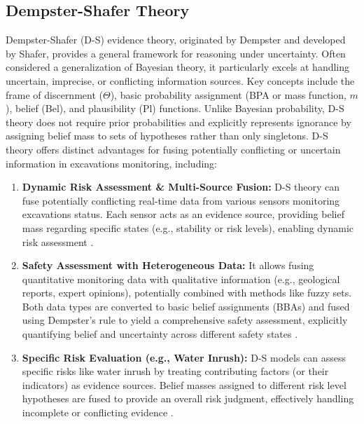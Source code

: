 \documentclass[preprint,11pt,authoryear,3p]{elsarticle}
\begin{document}
\subsection{Dempster-Shafer Theory}

Dempster-Shafer (D-S) evidence theory, originated by Dempster and developed by Shafer, provides a general framework for reasoning under uncertainty. Often considered a generalization of Bayesian theory, it particularly excels at handling uncertain, imprecise, or conflicting information sources. Key concepts include the frame of discernment ($\Theta$), basic probability assignment (BPA or mass function, $m$), belief (Bel), and plausibility (Pl) functions. Unlike Bayesian probability, D-S theory does not require prior probabilities and explicitly represents ignorance by assigning belief mass to sets of hypotheses rather than only singletons.
D-S theory offers distinct advantages for fusing potentially conflicting or uncertain information in excavations monitoring, including:

\begin{enumerate}
    \item \textbf{Dynamic Risk Assessment \& Multi-Source Fusion:} D-S theory can fuse potentially conflicting real-time data from various sensors monitoring excavations status. Each sensor acts as an evidence source, providing belief mass regarding specific states (e.g., stability or risk levels), enabling dynamic risk assessment \citep{ABELLAN2021114987}.

    \item \textbf{Safety Assessment with Heterogeneous Data:} It allows fusing quantitative monitoring data with qualitative information (e.g., geological reports, expert opinions), potentially combined with methods like fuzzy sets. Both data types are converted to basic belief assignments (BBAs) and fused using Dempster's rule to yield a comprehensive safety assessment, explicitly quantifying belief and uncertainty across different safety states \citep{wu_collapse_2024}.

    \item \textbf{Specific Risk Evaluation (e.g., Water Inrush):} D-S models can assess specific risks like water inrush by treating contributing factors (or their indicators) as evidence sources. Belief masses assigned to different risk level hypotheses are fused to provide an overall risk judgment, effectively handling incomplete or conflicting evidence \citep{buildings14093022}.
\end{enumerate}
\end{document}
